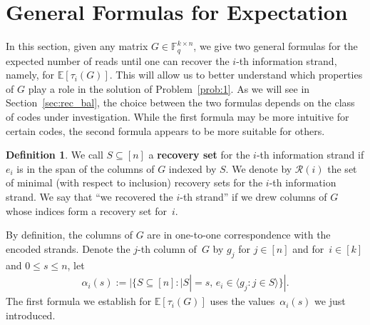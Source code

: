 \documentclass[11pt,a4paper,reqno,twoside]{amsart}
\theoremstyle{definition}
\newtheorem{definition}{Definition}
\newcommand{\F}{\mathbb{F}}
\newcommand{\E}{\mathbb{E}}
\newcommand{\mR}{\mathcal{R}}
\newcommand{\rcomment}[1]{{\color{red}#1}}
\newcommand{\pcomment}[1]{{\color{purple}#1}}
\newcommand{\vcomment}[1]{{\color{violet}#1}}
\newcommand{\brcomment}[1]{{\color{BrickRed}#1}}
\newcommand{\ag}[1]{{\footnotesize [\brcomment{#1}\;\;\rcomment{--Anina}]}}
\newcommand{\ey}[1]{{{\footnotesize [\pcomment{#1}\;\;\vcomment{--Eitan}]}}}
\begin{document}
\section{General Formulas for Expectation}\label{sec:general}

In this section, given any matrix $G\in \F_q^{k \times n}$, we give two general formulas for the expected number of reads until one can recover the $i$-th information strand, namely, for $\E[\tau_i(G)]$. This will allow us to better understand which properties of 
$G$ play a role in the solution of Problem~\ref{prob:1}. 
As we will see in Section~\ref{sec:rec_bal}, the choice between the two formulas depends on the class of codes under investigation. While the first formula may be more intuitive for certain codes, the second formula appears to be more suitable for others. %

\begin{definition}
We call $S \subseteq [n]$ a \textbf{recovery set} for the $i$-th information strand if $e_i$ is in the span of the columns of $G$ indexed by $S$. We denote by $\mR(i)$ the set of minimal (with respect to inclusion) recovery sets for the $i$-th information strand. We say that ``we recovered the $i$-th strand'' if we drew columns of $G$ whose indices form a recovery set for~$i$.
\end{definition}


By definition, the columns of $G$ are in one-to-one correspondence with the encoded strands. Denote the $j$-th column of~$G$ by $g_j$ for $j \in [n]$ and for~$i\in [k]$ and $0 \le s \le n$, let 
\begin{align*}
\alpha_i(s) := {|\{S \subseteq [n] : |S| = s, \, e_i \in \langle g_j : j \in S\rangle \}|}.
\end{align*}
The first formula we establish for $\E[\tau_i(G)]$ uses the values~$\alpha_i(s)$ we just introduced.
\end{document}
